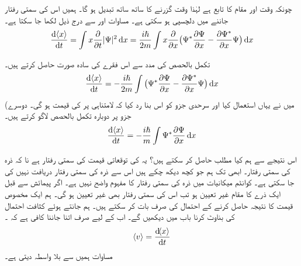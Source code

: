  چونکہ  وقت اور مقام کا تابع ہے لہٰذا وقت گزرنے کا ساتھ ساتھ  تبدیل ہو گا۔ ہمیں اس کی سمتی رفتار جاننے میں دلچسپی ہو سکتی ہے۔ مساوات   اور   سے درج ذیل لکھا جا سکتا ہے۔
\begin{align}\label{مساوات_تفاعل_موج_رفتار_توقعاتی_الف}
\frac{\dif \,\langle x \rangle}{\dif{t}}=\int x\frac{\partial}{\partial{t}}|\Psi|^{2}\dif{x}=\frac{i\hslash}{2m}\int x\frac{\partial}{\partial{x}}\big (\Psi ^*\frac{\partial{\Psi}}{\partial{x}}-\frac{\partial{\Psi^ *}}{\partial{x}}\Psi \big)\dif{x}
\end{align}

تکمل بالحصص  کی مدد سے اس فقرے کی سادہ  صورت حاصل کرتے ہیں۔
\begin{align}
\frac{\dif\, \langle x \rangle}{\dif{t}}=-\frac{i\hslash}{2m}\int\big (\Psi^*\frac{\partial{\Psi}}{\partial{x}}-\frac{\partial{\Psi^*}}{\partial{x}}\Psi \big)\dif{x}
\end{align}
(میں نے یہاں  استعمال کیا اور سرحدی جزو کو اس بنا رد کیا کہ  لامتناہی پر  کی قیمت   ہو گی۔ دوسرے جزو پر  دوبارہ تکمل بالحصص لاگو کرتے ہیں۔
\begin{align}\label{مساوات_تفاعل_موج_توقعاتی_قیمت_رفتار}
\frac{\dif \,\langle x \rangle}{\dif{t}}=-\frac{i\hslash}{m}\int\Psi^*\frac{\partial{\Psi}}{\partial{x}} \dif{x}
\end{align}

اس نتیجے سے ہم کیا مطلب حاصل کر سکتے ہیں؟ یہ   کی توقعاتی قیمت کی سمتی رفتار ہے نا کہ  ذرہ کی سمتی رفتار۔  ابھی تک ہم جو کچھ دیکھ چکے ہیں اس سے ذرہ  کی سمتی رفتار دریافت نہیں کی جا سکتی ہے۔ کوانٹم میکانیات میں ذرہ  کی  سمتی رفتار کا مفہوم واضح  نہیں ہے۔ اگر پیمائش سے قبل ایک ذرے کا مقام  غیر تعیین  ہو تب اس کی سمتی رفتار بھی غیر تعیین ہو گی۔ ہم ایک مخصوص قیمت کا نتیجہ حاصل کرنے کے احتمال کی صرف بات کر سکتے ہیں۔ ہم  جانتے ہوئے کثافت احتمال کی بناوٹ کرنا باب  میں دیکھیں گے۔ اب کے لیے صرف اتنا جاننا کافی ہے کہ  ۔
\begin{align}\label{مساوات_تفاعل_موج_تعریف_رفتار}
\langle v \rangle=\frac{\dif\langle x \rangle}{\dif{t}}
\end{align}
مساوات  ہمیں  سے بلا واسطہ  دیتی ہے۔ 


